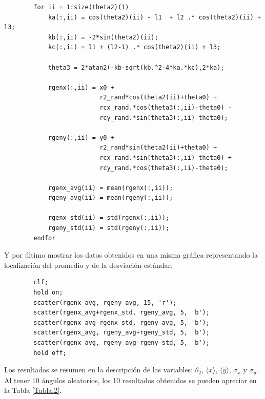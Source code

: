 \documentclass[a4paper, 12pt]{article}
\begin{document}
    \begin{verbatim}
        for ii = 1:size(theta2)(1)
            ka(:,ii) = cos(theta2)(ii) - l1  + l2 .* cos(theta2)(ii) + l3;
            kb(:,ii) = -2*sin(theta2)(ii);
            kc(:,ii) = l1 + (l2-1) .* cos(theta2)(ii) + l3;

            theta3 = 2*atan2(-kb-sqrt(kb.^2-4*ka.*kc),2*ka);
            
            rgenx(:,ii) = x0 +
                          r2_rand*cos(theta2(ii)+theta0) +
                          rcx_rand.*cos(theta3(:,ii)-theta0) -
                          rcy_rand.*sin(theta3(:,ii)-theta0);

            rgeny(:,ii) = y0 +
                          r2_rand*sin(theta2(ii)+theta0) +
                          rcx_rand.*sin(theta3(:,ii)-theta0) +
                          rcy_rand.*cos(theta3(:,ii)-theta0);
            
            rgenx_avg(ii) = mean(rgenx(:,ii));
            rgeny_avg(ii) = mean(rgeny(:,ii));
            
            rgenx_std(ii) = std(rgenx(:,ii));
            rgeny_std(ii) = std(rgeny(:,ii));
        endfor
    \end{verbatim}

    Y por último mostrar los datos obtenidos en una misma gráfica representando la localización del promedio y de la desviación estándar.

    \begin{verbatim}
        clf;
        hold on;
        scatter(rgenx_avg, rgeny_avg, 15, 'r');
        scatter(rgenx_avg+rgenx_std, rgeny_avg, 5, 'b');
        scatter(rgenx_avg-rgenx_std, rgeny_avg, 5, 'b');
        scatter(rgenx_avg, rgeny_avg+rgeny_std, 5, 'b');
        scatter(rgenx_avg, rgeny_avg-rgeny_std, 5, 'b');
        hold off;
    \end{verbatim}

    Los resultados se resumen en la descripción de las variables: $\theta_2$, $\langle x \rangle$, $\langle y \rangle$, $\sigma_x$ y $\sigma_y$. Al tener 10 ángulos aleatorios, los 10 resultados obtenidos se pueden apreciar en la Tabla \ref{Tabla:2}.
\end{document}

